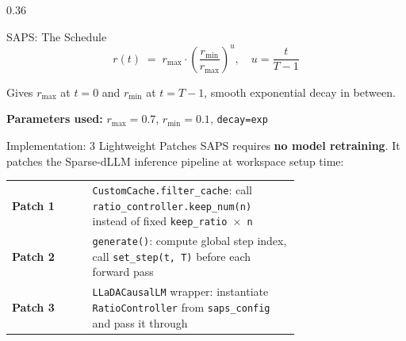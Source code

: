 \documentclass[final]{beamer}
\newcommand{\tight}{\vspace{-0.5em}}
\newcommand{\sep}{\vspace{0.8em}}
\begin{document}
\begin{frame}[t]{}
\begin{columns}[t,totalwidth=\linewidth]
\begin{column}{0.36\linewidth}
\begin{alertblock}{SAPS: The Schedule}
    \[
      r(t) \;=\; r_{\max} \cdot \!\left(\frac{r_{\min}}{r_{\max}}\right)^{\!u},
      \quad u = \frac{t}{T-1}
    \]

    Gives $r_{\max}$ at $t=0$ and $r_{\min}$ at $t=T-1$, smooth
    exponential decay in between.

    \sep
    \begin{center}
    \end{center}

    \tight
    \textbf{Parameters used:} $r_{\max}=0.7$,\; $r_{\min}=0.1$,\;
    \texttt{decay=exp}
  \end{alertblock}

  \vspace{0.8em}

  \begin{block}{Implementation: 3 Lightweight Patches}
    SAPS requires \textbf{no model retraining}. It patches the
    Sparse-dLLM inference pipeline at workspace setup time:

    \vspace{0.4em}
    \begin{tabular}{@{}lp{0.72\linewidth}@{}}
      \textbf{Patch 1} & \texttt{CustomCache.filter\_cache}: call
                          \texttt{ratio\_controller.keep\_num(n)}
                          instead of fixed \texttt{keep\_ratio~$\times$~n} \\[0.4em]
      \textbf{Patch 2} & \texttt{generate()}: compute global step index,
                          call \texttt{set\_step(t,\,T)} before each
                          forward pass \\[0.4em]
      \textbf{Patch 3} & \texttt{LLaDACausalLM} wrapper: instantiate
                          \texttt{RatioController} from \texttt{saps\_config}
                          and pass it through \\
    \end{tabular}


\end{block}
\end{column}
\end{columns}
\end{frame}
\end{document}

